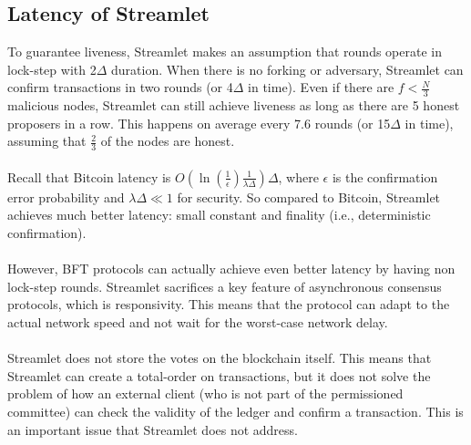 \subsection{Latency of Streamlet}
To guarantee liveness, Streamlet makes an assumption that rounds operate in lock-step with 2$\Delta$ duration. When there is no forking or adversary, Streamlet can confirm transactions in two rounds (or 4$\Delta$ in time). Even if there are $f < \frac{N}{3}$ malicious nodes, Streamlet can still achieve liveness as long as there are 5 honest proposers in a row. This happens on average every 7.6 rounds (or 15$\Delta$ in time), assuming that $\frac{2}{3}$ of the nodes are honest.\\\\
Recall that Bitcoin latency is $O(\ln(\frac{1}{\epsilon	})\frac{1}{\lambda\Delta})\Delta$, where $\epsilon$ is the confirmation error probability and $\lambda\Delta \ll 1$ for security. So compared to Bitcoin, Streamlet achieves much better latency: small constant and finality (i.e., deterministic confirmation).\\\\
However, BFT protocols can actually achieve even better latency by having non lock-step rounds. Streamlet sacrifices a key feature of asynchronous consensus protocols, which is responsivity. This means that the protocol can adapt to the actual network speed and not wait for the worst-case network delay. \\\\
Streamlet does not store the votes on the blockchain itself. This means that Streamlet can create a total-order on transactions, but it does not solve the problem of how an external client (who is not part of the permissioned committee) can check the validity of the ledger and confirm a transaction. This is an important issue that Streamlet does not address.


